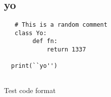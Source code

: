 \chapter{}%
\label{ch:proof-of-concept}
\section{yo}

\begin{listing}[H]
\begin{verbatim}
   # This is a random comment
   class Yo:
        def fn:
            return 1337
   
  print(``yo'')
  
\end{verbatim}
\caption{Test code format}
\end{listing}